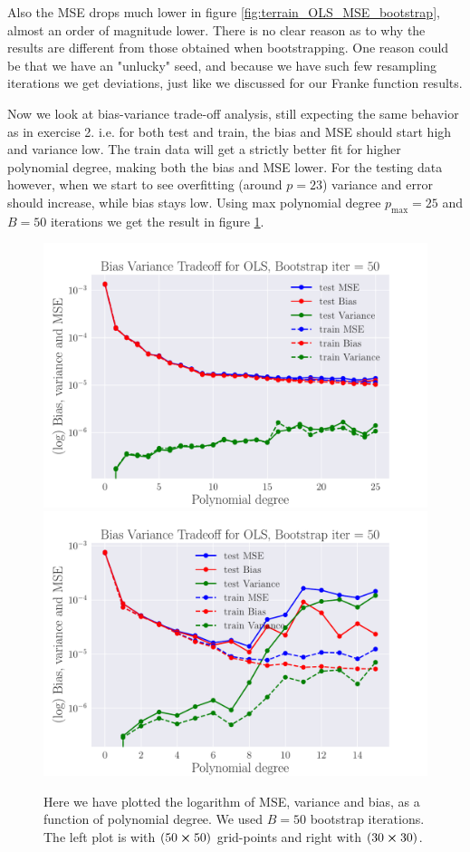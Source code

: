 \documentclass[reprint,english,notitlepage,aps,nobalancelastpage,nofootinbib]{revtex4-1}  %
\begin{document}
Also the MSE drops much lower in figure \ref{fig:terrain_OLS_MSE_bootstrap}, almost an order of magnitude lower. There is no clear reason as to why the results are different from those obtained when bootstrapping. One reason could be that we have an "unlucky" seed, and because we have such few resampling iterations we get deviations, just like we discussed for our Franke function results.

Now we look at bias-variance trade-off analysis, still expecting the same behavior as in exercise 2. i.e. for both test and train, the bias and MSE should start high and variance low. The train data will get a strictly better fit for higher polynomial degree, making both the bias and MSE lower. For the testing data however, when we start to see overfitting (around $p=23$) variance and error should increase, while bias stays low. Using max polynomial degree $p_\text{max}=25$ and $B=50$ iterations we get the result in figure \ref{fig:terrain_OLS_BVT}.

\begin{figure}[H]
	\includegraphics[width=\linewidth]{SRTM_BVT_OLS_n50_log.pdf}
	\endminipage\hfill
	\includegraphics[width=\linewidth]{SRTM_BVT_OLS_n30_log.pdf}
	\endminipage
	\caption{Here we have plotted the logarithm of MSE, variance and bias, as a function of polynomial degree. We used $B=50$ bootstrap iterations. The left plot is with $(50\cross50)$ grid-points and right with $(30\cross30)$.}
  \label{fig:terrain_OLS_BVT}
\end{figure}
\end{document}
